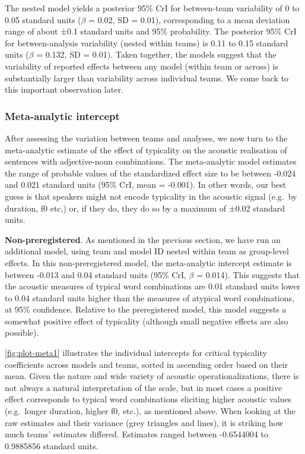 \documentclass[Review,times,sageh]{sagej}
\begin{document}
The nested model yields a posterior 95\% CrI for between-team variability of 0 to 0.05 standard units (\(\beta\) = 0.02, SD = 0.01), corresponding to a mean deviation range of about ±0.1 standard units and 95\% probability.
The posterior 95\% CrI for between-analysis variability (nested within teams) is 0.11 to 0.15 standard units (\(\beta\) = 0.132, SD = 0.01).
Taken together, the models suggest that the variability of reported effects between any model (within team or across) is substantially larger than variability across individual teams.
We come back to this important observation later.

\hypertarget{meta-analytic-intercept}{%
\subsubsection{Meta-analytic intercept}\label{meta-analytic-intercept}}

After assessing the variation between teams and analyses, we now turn to the meta-analytic estimate of the effect of typicality on the acoustic realisation of sentences with adjective-noun combinations.
The meta-analytic model estimates the range of probable values of the standardized effect size to be between -0.024 and 0.021 standard units (95\% CrI, mean = -0.001).
In other words, our best guess is that speakers might not encode typicality in the acoustic signal (e.g.~by duration, f0 etc,) or, if they do, they do so by a maximum of ±0.02 standard units.

\textbf{Non-preregistered}. As mentioned in the previous section, we have run an additional model, using team and model ID nested within team as group-level effects.
In this non-preregistered model, the meta-analytic intercept estimate is between -0.013 and 0.04 standard units (95\% CrI, \(\beta\) = 0.014).
This suggests that the acoustic measures of typical word combinations are 0.01 standard units lower to 0.04 standard units higher than the measures of atypical word combinations, at 95\% confidence.
Relative to the preregistered model, this model suggests a somewhat positive effect of typicality (although small negative effects are also possible).

\ref{fig:plot-meta1} illustrates the individual intercepts for critical typicality coefficients across models and teams, sorted in ascending order based on their mean.
Given the nature and wide variety of acoustic operationalizations, there is not always a natural interpretation of the scale, but in most cases a positive effect corresponds to typical word combinations eliciting higher acoustic values (e.g.~longer duration, higher f0, etc.), as mentioned above.
When looking at the raw estimates and their variance (grey triangles and lines), it is striking how much teams' estimates differed.
Estimates ranged between -0.6544004 to 0.9885856 standard units.
\end{document}
